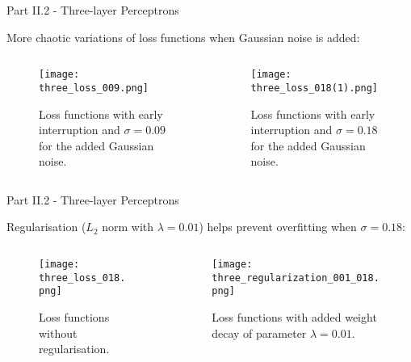 \documentclass{beamer}
\begin{document}
\begin{frame}{Part II.2 - Three-layer Perceptrons}
    
    More chaotic variations of loss functions when Gaussian noise is added:
    
  \begin{columns}[T]
    \begin{column}{.5\textwidth}
    \begin{block}{}
    \begin{figure} [H]
    \centering
    \texttt{[image: three\_loss\_009.png]}
    \caption{Loss functions with early interruption and $\sigma=0.09$ for the added Gaussian noise.}
    \end{figure}
    \end{block}
    \end{column}
    \begin{column}{.5\textwidth}
    \begin{block}{}
    \begin{figure} [H]
    \centering
    \texttt{[image: three\_loss\_018(1).png]}
    \caption{Loss functions with early interruption and $\sigma=0.18$ for the added Gaussian noise.}
    \end{figure}
    \end{block}
    \end{column}
  \end{columns}
    
\end{frame}


\begin{frame}{Part II.2 - Three-layer Perceptrons}
    
  Regularisation ($L_2$ norm with $\lambda=0.01$) helps prevent overfitting when $\sigma=0.18$:

  \begin{columns}[T]
    \begin{column}{.5\textwidth}
    \begin{block}{}
    \begin{figure} [H]
    \centering
    \texttt{[image: three\_loss\_018.png]}
    \caption{Loss functions without regularisation.}
    \end{figure}
    \end{block}
    \end{column}
    \begin{column}{.5\textwidth}
    \begin{block}{}
    \begin{figure} [H]
    \centering
    \texttt{[image: three\_regularization\_001\_018.png]}
    \caption{Loss functions with added weight decay of parameter $\lambda=0.01$.}
    \end{figure}
    \end{block}
    \end{column}
  \end{columns}
    
\end{frame}
\end{document}
